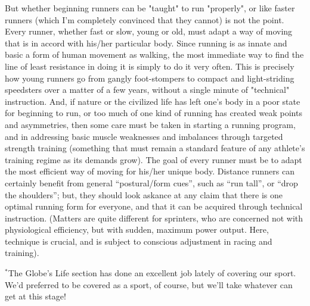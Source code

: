 But whether beginning runners can be "taught" to run "properly", or like faster runners (which I'm completely convinced that they cannot) is not the point. Every runner, whether fast or slow, young or old, must adapt a way of moving that is in accord with his/her particular body. Since running is as innate and basic a form of human movement as walking, the most immediate way to find the line of least resistance in doing it is simply to do it very often. This is precisely how young runners go from gangly foot-stompers to compact and light-striding speedsters over a matter of a few years, without a single minute of "technical" instruction. And, if nature or the civilized life has left one's body in a poor state for beginning to run, or too much of one kind of running has created weak points and asymmetries, then some care must be taken in starting a running program, and in addressing basic muscle weaknesses and imbalances through targeted strength training (something that must remain a standard feature of any athlete's training regime as its demands grow). The goal of every runner must be to adapt the most efficient way of moving for his/her unique body. Distance runners can certainly benefit from general “postural/form cues”, such as “run tall”, or “drop the shoulders”; but, they should look askance at any claim that there is one optimal running form for everyone, and that it can be acquired through technical instruction. (Matters are quite different for sprinters, who are concerned not with physiological efficiency, but with sudden, maximum power output. Here, technique is crucial, and is subject to conscious adjustment in racing and training).

\bigskip

$^*$The Globe’s Life section has done an excellent job lately of covering our sport. We’d preferred to be covered as a sport, of course, but we’ll take whatever can get at this stage!
